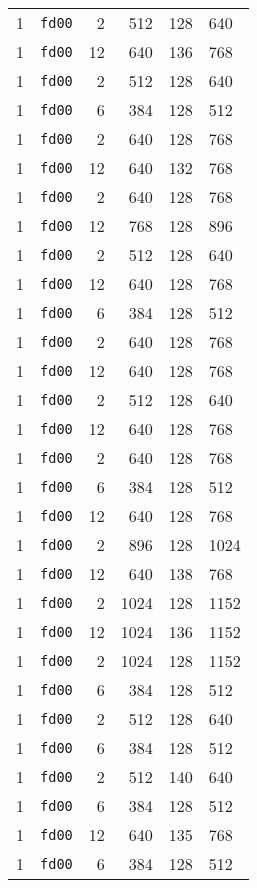 \documentclass{article}
\begin{document}
\begin{table}[h!]
\begin{tabular}{llrrrl}
    1 & \texttt{fd00} & 2 & 512 & 128 & 640 \\
    1 & \texttt{fd00} & 12 & 640 & 136 & 768 \\
    1 & \texttt{fd00} & 2 & 512 & 128 & 640 \\
    1 & \texttt{fd00} & 6 & 384 & 128 & 512 \\
    1 & \texttt{fd00} & 2 & 640 & 128 & 768 \\
    1 & \texttt{fd00} & 12 & 640 & 132 & 768 \\
    1 & \texttt{fd00} & 2 & 640 & 128 & 768 \\
    1 & \texttt{fd00} & 12 & 768 & 128 & 896 \\
    1 & \texttt{fd00} & 2 & 512 & 128 & 640 \\
    1 & \texttt{fd00} & 12 & 640 & 128 & 768 \\
    1 & \texttt{fd00} & 6 & 384 & 128 & 512 \\
    1 & \texttt{fd00} & 2 & 640 & 128 & 768 \\
    1 & \texttt{fd00} & 12 & 640 & 128 & 768 \\
    1 & \texttt{fd00} & 2 & 512 & 128 & 640 \\
    1 & \texttt{fd00} & 12 & 640 & 128 & 768 \\
    1 & \texttt{fd00} & 2 & 640 & 128 & 768 \\
    1 & \texttt{fd00} & 6 & 384 & 128 & 512 \\
    1 & \texttt{fd00} & 12 & 640 & 128 & 768 \\
    1 & \texttt{fd00} & 2 & 896 & 128 & 1024 \\
    1 & \texttt{fd00} & 12 & 640 & 138 & 768 \\
    1 & \texttt{fd00} & 2 & 1024 & 128 & 1152 \\
    1 & \texttt{fd00} & 12 & 1024 & 136 & 1152 \\
    1 & \texttt{fd00} & 2 & 1024 & 128 & 1152 \\
    1 & \texttt{fd00} & 6 & 384 & 128 & 512 \\
    1 & \texttt{fd00} & 2 & 512 & 128 & 640 \\
    1 & \texttt{fd00} & 6 & 384 & 128 & 512 \\
    1 & \texttt{fd00} & 2 & 512 & 140 & 640 \\
    1 & \texttt{fd00} & 6 & 384 & 128 & 512 \\
    1 & \texttt{fd00} & 12 & 640 & 135 & 768 \\
    1 & \texttt{fd00} & 6 & 384 & 128 & 512 \\

\end{tabular}
\end{table}
\end{document}
